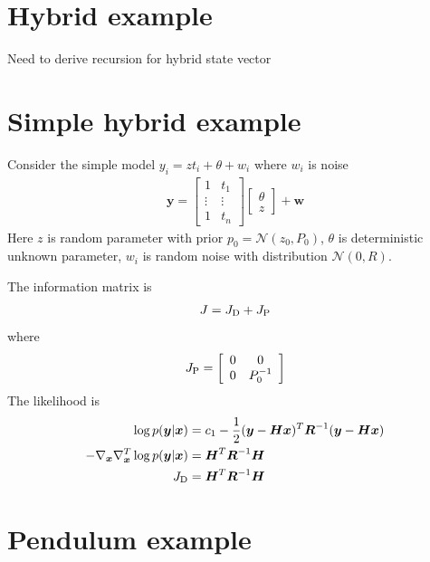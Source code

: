 \documentclass{article}
\renewcommand{\vec}[1]{\ensuremath{{\boldsymbol #1}}}
\newcommand{\mat}[1]{\ensuremath{\boldsymbol{#1}}}
\begin{document}
\section{Hybrid example}

Need to derive recursion for hybrid state vector

\section{Simple hybrid example}

Consider the simple model $y_i = z t_i + \theta + w_i$ where $w_i$ is noise
\begin{align}
	\vec y = \left[\begin{array}{cc}
	 				 1 & t_1 \\ \vdots & \vdots \\ 1 & t_n 
					\end{array}\right] \left[\begin{array}{c}
					 				 \theta \\ z
									\end{array}\right] 	+ \vec w
\end{align}
Here $z$ is random parameter with prior $p_0 = \mathcal N(z_0,P_0)$, $\theta$ is deterministic unknown parameter, $w_i$ is random noise with distribution $\mathcal N(0,R)$.

The information matrix is
\begin{align}
	J = J_{\rm D} + J_{\rm P}
\end{align}
where
\begin{align}
	J_{\rm P} = \left[\begin{array}{cc}
	 				 0 & 0 \\ 0 & P_0^{-1} 
					\end{array}\right]
\end{align}
The likelihood is
\begin{align}
	\log p(\vec y|\vec x) &= c_1 -\frac{1}{2}(\vec y - \mat H\vec x)^T \mat R^{-1} (\vec y - \mat H\vec x) \\
-\nabla_{\vec x}\nabla_{\vec x}^T \log p(\vec y|\vec x) &= \mat H^T\mat R^{-1} \mat H \\
J_{\rm D} &= \mat H^T\mat R^{-1}\mat H
\end{align}


\section{Pendulum example}
\end{document}
